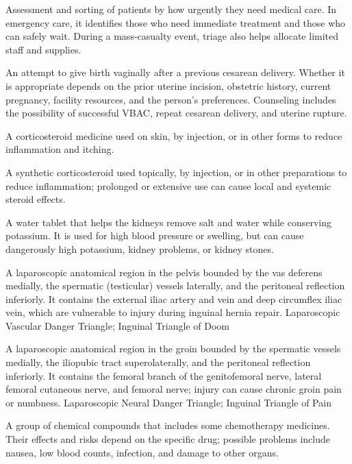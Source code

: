  Assessment and sorting of patients by how urgently they need medical care. In emergency care, it identifies those who need immediate treatment and those who can safely wait. During a mass-casualty event, triage also helps allocate limited staff and supplies.

 An attempt to give birth vaginally after a previous cesarean delivery. Whether it is appropriate
depends on the prior uterine incision, obstetric history, current pregnancy, facility
resources, and the person’s preferences. Counseling includes the possibility of successful
VBAC, repeat cesarean delivery, and uterine rupture.

 A corticosteroid medicine used on skin, by injection, or in other forms to reduce inflammation and itching.

 A synthetic corticosteroid used topically, by injection, or in other preparations to reduce inflammation; prolonged or extensive use can cause local and systemic steroid effects.

 A water tablet that helps the kidneys remove salt and water while conserving potassium. It is used for high blood pressure or swelling, but can cause dangerously high potassium, kidney problems, or kidney stones.

 A laparoscopic anatomical region in the pelvis bounded by the vas deferens medially, the spermatic (testicular) vessels laterally, and the peritoneal reflection inferiorly. It contains the external iliac artery and vein and deep circumflex iliac vein, which are vulnerable to injury during inguinal hernia repair.
\synonyms
Laparoscopic Vascular Danger Triangle; Inguinal Triangle of Doom

 A laparoscopic anatomical region in the groin bounded by the spermatic vessels medially, the iliopubic tract superolaterally, and the peritoneal reflection inferiorly. It contains the femoral branch of the genitofemoral nerve, lateral femoral cutaneous nerve, and femoral nerve; injury can cause chronic groin pain or numbness.
\synonyms
Laparoscopic Neural Danger Triangle; Inguinal Triangle of Pain

 A group of chemical compounds that includes some chemotherapy medicines. Their effects and risks depend on the specific drug; possible problems include nausea, low blood counts, infection, and damage to other organs.

